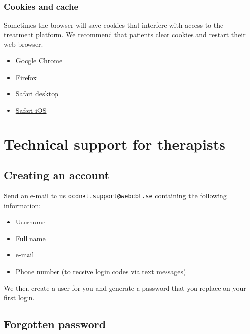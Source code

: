 \documentclass[]{book}
\providecommand{\tightlist}{%
  \setlength{\itemsep}{0pt}\setlength{\parskip}{0pt}}
\theoremstyle{definition}
\theoremstyle{definition}
\theoremstyle{definition}
\theoremstyle{remark}
\begin{document}
\hypertarget{cookies-and-cache}{%
\subsubsection{Cookies and cache}\label{cookies-and-cache}}

Sometimes the browser will save cookies that interfere with access to
the treatment platform. We recommend that patients clear cookies and
restart their web browser.

\begin{itemize}
\tightlist
\item
  \href{https://support.google.com/chrome/answer/95647?co=GENIE.Platform\%3DDesktop\&hl=en}{Google
  Chrome}
\item
  \href{https://support.mozilla.org/en-US/kb/delete-cookies-remove-info-websites-stored}{Firefox}
\item
  \href{https://support.apple.com/kb/ph21411?locale=en_US}{Safari
  desktop}
\item
  \href{https://support.apple.com/en-gb/HT201265}{Safari iOS}
\end{itemize}

\hypertarget{technical-support-for-therapists}{%
\section{Technical support for
therapists}\label{technical-support-for-therapists}}

\hypertarget{creating-an-account}{%
\subsection{Creating an account}\label{creating-an-account}}

Send an e-mail to us
\href{mailto:ocdnet.support@webcbt.se}{\nolinkurl{ocdnet.support@webcbt.se}}
containing the following information:

\begin{itemize}
\tightlist
\item
  Username
\item
  Full name
\item
  e-mail
\item
  Phone number (to receive login codes via text messages)
\end{itemize}

We then create a user for you and generate a password that you replace
on your first login.

\hypertarget{forgotten-password}{%
\subsection{Forgotten password}\label{forgotten-password}}
\end{document}
